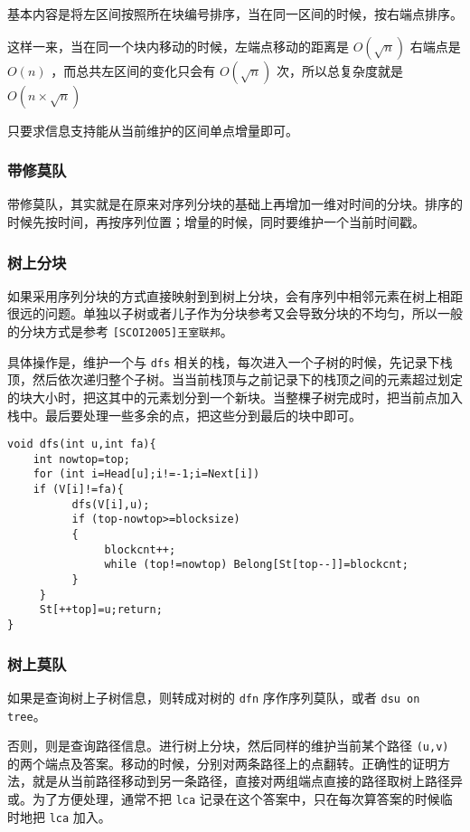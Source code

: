 \documentclass[UTF-8]{ctexart}
\begin{document}
	基本内容是将左区间按照所在块编号排序，当在同一区间的时候，按右端点排序。
	
	这样一来，当在同一个块内移动的时候，左端点移动的距离是 $O(\sqrt{n})$ 右端点是 $O(n)$ ，而总共左区间的变化只会有 $O(\sqrt{n})$ 次，所以总复杂度就是 $O(n \times \sqrt{n})$
	
	只要求信息支持能从当前维护的区间单点增量即可。
	
	\subsubsection{带修莫队}
	带修莫队，其实就是在原来对序列分块的基础上再增加一维对时间的分块。排序的时候先按时间，再按序列位置；增量的时候，同时要维护一个当前时间戳。
	
	\subsubsection{树上分块}
	如果采用序列分块的方式直接映射到到树上分块，会有序列中相邻元素在树上相距很远的问题。单独以子树或者儿子作为分块参考又会导致分块的不均匀，所以一般的分块方式是参考 \texttt{[SCOI2005]王室联邦}。
	
	具体操作是，维护一个与 \texttt{dfs} 相关的栈，每次进入一个子树的时候，先记录下栈顶，然后依次递归整个子树。当当前栈顶与之前记录下的栈顶之间的元素超过划定的块大小时，把这其中的元素划分到一个新块。当整棵子树完成时，把当前点加入栈中。最后要处理一些多余的点，把这些分到最后的块中即可。
\begin{verbatim}
void dfs(int u,int fa){
    int nowtop=top;
    for (int i=Head[u];i!=-1;i=Next[i])
    if (V[i]!=fa){
          dfs(V[i],u);
          if (top-nowtop>=blocksize)
          {
               blockcnt++;
               while (top!=nowtop) Belong[St[top--]]=blockcnt;
          }
     }
     St[++top]=u;return;
}
\end{verbatim}

	\subsubsection{树上莫队}
	如果是查询树上子树信息，则转成对树的 \texttt{dfn} 序作序列莫队，或者 \texttt{dsu on tree}。
	
	否则，则是查询路径信息。进行树上分块，然后同样的维护当前某个路径 \texttt{(u,v)} 的两个端点及答案。移动的时候，分别对两条路径上的点翻转。正确性的证明方法，就是从当前路径移动到另一条路径，直接对两组端点直接的路径取树上路径异或。为了方便处理，通常不把 \texttt{lca} 记录在这个答案中，只在每次算答案的时候临时地把 \texttt{lca} 加入。
	
\end{document}
